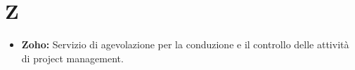 \section{Z}
\begin{itemize}
	\item \textbf{Zoho:} Servizio di agevolazione per la conduzione e il controllo delle attività di project management.
\end{itemize}
  
